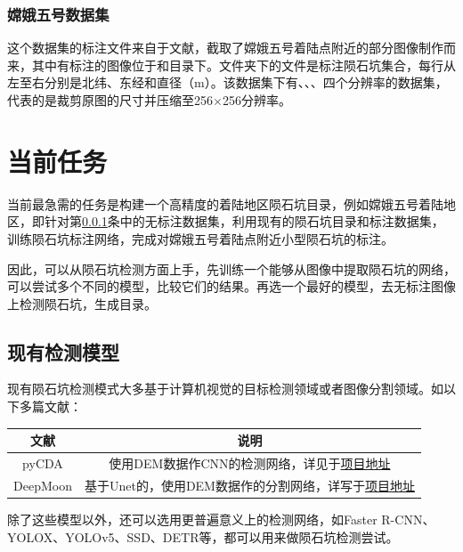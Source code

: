 \documentclass{article}
\begin{document}
\subsubsection{嫦娥五号数据集}
\label{sec:嫦娥五号数据集}
这个数据集的标注文件来自于文献\cite{liuIdentificationLunarCraters2024}，截取了嫦娥五号着陆点附近的部分图像制作而来，其中有标注的图像位于和目录下。文件夹下的文件是标注陨石坑集合，每行从左至右分别是北纬、东经和直径（m）。该数据集下有、、、四个分辨率的数据集，代表的是裁剪原图的尺寸并压缩至256$\times$256分辨率。
\section{当前任务}
当前最急需的任务是构建一个高精度的着陆地区陨石坑目录，例如嫦娥五号着陆地区，即针对第\ref{sec:嫦娥五号数据集}条中的无标注数据集，利用现有的陨石坑目录和标注数据集，训练陨石坑标注网络，完成对嫦娥五号着陆点附近小型陨石坑的标注。\par
因此，可以从陨石坑检测方面上手，先训练一个能够从图像中提取陨石坑的网络，可以尝试多个不同的模型，比较它们的结果。再选一个最好的模型，去无标注图像上检测陨石坑，生成目录。
\subsection{现有检测模型}
现有陨石坑检测模式大多基于计算机视觉的目标检测领域或者图像分割领域。如以下多篇文献：
\begin{table}[H]
  \centering
    \begin{tabular}{c|c}
      \toprule
      文献& 说明\\
      \hline
      pyCDA\cite{cohenCraterDetectionConvolutional2016}&使用DEM数据作CNN的检测网络，详见于\href{https://github.com/AlliedToasters/PyCDA?tab=readme-ov-file}{项目地址}\\
      DeepMoon\cite{leeAutomatedCraterDetection2019} & 基于Unet的，使用DEM数据作的分割网络，详写于\href{https://github.com/silburt/DeepMoon}{项目地址}\\
      \bottomrule
    \end{tabular}
\end{table}
除了这些模型以外，还可以选用更普遍意义上的检测网络，如Faster R-CNN、YOLOX、YOLOv5、SSD、DETR等，都可以用来做陨石坑检测尝试。
\newpage
\printbibliography[heading=bibliography,title=参考文献]
\end{document}
